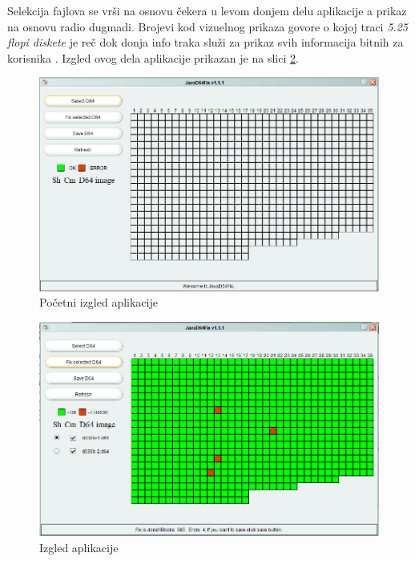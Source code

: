 Selekcija fajlova se vrši na osnovu čekera u levom donjem delu aplikacije a prikaz na osnovu radio dugmadi. Brojevi kod vizuelnog prikaza govore o kojoj traci \textit{5.25 flopi diskete} je reč dok donja info traka služi za prikaz svih informacija bitnih za korisnika \cite{Projekat}. Izgled ovog dela aplikacije prikazan je na slici \ref{img:aplikacija1}.

\begin{figure}[ht]
\begin{center}
\includegraphics[width=\textwidth]{img/aplikacija.png}
\caption{Početni izgled aplikacije}
\label{img:aplikacija}
\end{center}
\end{figure}

\begin{figure}[ht]
\begin{center}
\includegraphics[width=\textwidth]{img/aplikacija1.png}
\caption{Izgled aplikacije}
\label{img:aplikacija1}
\end{center}
\end{figure}
